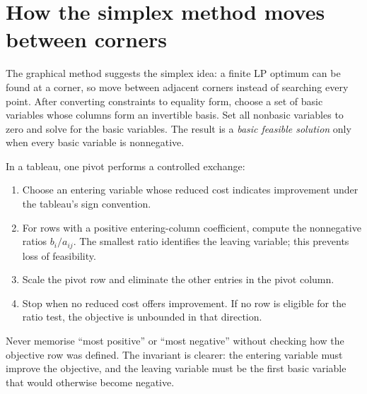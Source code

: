 \documentclass[11pt,a4paper]{article}
\begin{document}
\section{How the simplex method moves between corners}
The graphical method suggests the simplex idea: a finite LP optimum can be found at a corner, so move between adjacent corners instead of searching every point. After converting constraints to equality form, choose a set of basic variables whose columns form an invertible basis. Set all nonbasic variables to zero and solve for the basic variables. The result is a \emph{basic feasible solution} only when every basic variable is nonnegative.

In a tableau, one pivot performs a controlled exchange:
\begin{enumerate}
\item Choose an entering variable whose reduced cost indicates improvement under the tableau's sign convention.
\item For rows with a positive entering-column coefficient, compute the nonnegative ratios $b_i/a_{ij}$. The smallest ratio identifies the leaving variable; this prevents loss of feasibility.
\item Scale the pivot row and eliminate the other entries in the pivot column.
\item Stop when no reduced cost offers improvement. If no row is eligible for the ratio test, the objective is unbounded in that direction.
\end{enumerate}
Never memorise ``most positive'' or ``most negative'' without checking how the objective row was defined. The invariant is clearer: the entering variable must improve the objective, and the leaving variable must be the first basic variable that would otherwise become negative.
\end{document}
